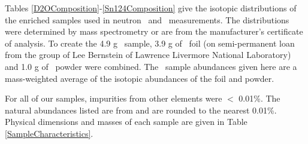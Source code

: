 Tables \ref{D2OComposition}-\ref{Sn124Composition} give the isotopic
distributions of the 
enriched samples used in neutron \tot\ and \el\ measurements. The distributions
were determined by mass spectrometry or are from the manufacturer's certificate of analysis. 
To create the 4.9 g \snTwelve\ sample, 3.9 g of \snTwelve\ foil
(on semi-permanent loan from the group of Lee Bernstein of Lawrence Livermore
National Laboratory) and 1.0 g of
\snTwelve\ powder were combined. The
\snTwelve\ sample abundances given here are a mass-weighted average of the isotopic
abundances of the foil and powder.

For all of our samples, impurities from other elements were $<$ 0.01\%.
The natural abundances listed are from \cite{TICE1997} and are rounded to the nearest 0.01\%.
Physical dimensions and masses of each sample are given in Table \ref{SampleCharacteristics}.

